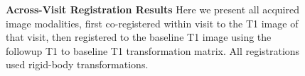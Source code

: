 \begin{figure}
{} \hspace*{-0.9em}
\newline
   \hspace*{-0.9em}
\hfill
\hfill
\hfill
\caption{{\bf Across-Visit Registration Results} Here we present all acquired image modalities, first co-registered within visit to the T1 image of that visit, then registered to the baseline T1 image using the followup T1 to baseline T1 transformation matrix.  All registrations used rigid-body transformations.}
\label{fig:reg_results}
\end{figure}



